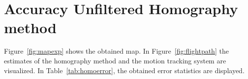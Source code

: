 \section{Accuracy Unfiltered Homography method}
\label{sec:exp:homovsopti}

Figure~\ref{fig:mapexp} shows the obtained map. In Figure~\ref{fig:flightpath} the estimates of the homography method and the motion tracking system are visualized. In Table~\ref{tab:homoerror}, the obtained error statistics are displayed.  